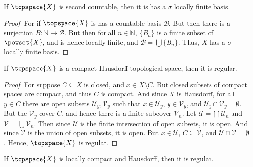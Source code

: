 \documentclass{article}                                                        %
\begin{document}
            \begin{theorem}
                \label{thm:Second_Countable_Implies_Sigma_Loc_Fin_Basis}%
                If $\topspace{X}$ is second countable, then it is has a $\sigma$
                locally finite basis.
            \end{theorem}
            \begin{proof}
                For if $\topspace{X}$ is has a countable basis $\mathcal{B}$. But
                then there is a surjection $B:\mathbb{N}\rightarrow\mathcal{B}$.
                But then for all $n\in\mathbb{N}$, $\{B_{n}\}$ is a finite subset
                of $\powset{X}$, and is hence locally finite, and
                $\mathcal{B}=\bigcup\{B_{n}\}$. Thus, $X$ has a $\sigma$ locally
                finite basis.
            \end{proof}
            \begin{theorem}
                \label{thm:Compact_Hausdorff_is_Regular}%
                If $\topspace{X}$ is a compact Hausdorff topological space, then it
                is regular.
            \end{theorem}
            \begin{proof}
                For suppose $C\subseteq{X}$ is closed, and $x\in{X}\setminus{C}$.
                But closed subsets of compact spaces are compact, and thus $C$ is
                compact. And since $X$ is Hausdorff, for all $y\in{C}$ there are
                open subsets $\mathcal{U}_{y},\mathcal{V}_{y}$ such that
                $x\in\mathcal{U}_{y}$, $y\in\mathcal{V}_{y}$, and
                $\mathcal{U}_{y}\cap\mathcal{V}_{y}=\emptyset$. But the
                $\mathcal{V}_{y}$ cover $C$, and hence there is a finite subcover
                $\mathcal{V}_{n}$. Let $\mathcal{U}=\bigcap\mathcal{U}_{n}$ and
                $\mathcal{V}=\bigcup\mathcal{V}_{n}$. Then since
                $\mathcal{U}$ is the finite intersection of open subsets, it is
                open. And since $\mathcal{V}$ is the union of open subsets, it is
                open. But $x\in\mathcal{U}$, $C\subseteq\mathcal{V}$, and
                $\mathcal{U}\cap\mathcal{V}=\emptyset$. Hence, $\topspace{X}$ is
                regular.
            \end{proof}
            \begin{theorem}
                \label{thm:Loc_Comp_and_Hausdorff_is_Regular}%
                If $\topspace{X}$ is locally compact and Hausdorff, then it is
                regular.
            \end{theorem}
\end{document}
